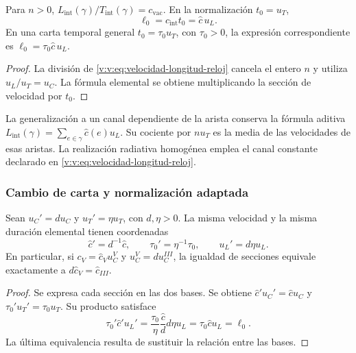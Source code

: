 \begin{corollary}
\label{v:v:cor:longitud-elemental-constitutiva}
Para $n>0$, $L_{\mathrm{int}}(\gamma)/T_{\mathrm{int}}(\gamma)
=c_{\mathrm{vac}}$. En la normalización $t_0=u_T$,
\begin{equation}
 \ell_0=c_{\mathrm{int}}t_0=\widehat c\,u_L.
 \label{v:v:eq:longitud-elemental-constitutiva}
\end{equation}
En una carta temporal general $t_0=\tau_0u_T$, con $\tau_0>0$,
la expresión correspondiente es $\ell_0=\tau_0\widehat c\,u_L$.
\end{corollary}
\begin{proof}
La división de \eqref{v:v:eq:velocidad-longitud-reloj} cancela el entero
$n$ y utiliza $u_L/u_T=u_C$. La fórmula elemental se obtiene
multiplicando la sección de velocidad por $t_0$.
\end{proof}

La generalización a un canal dependiente de la arista conserva la fórmula
aditiva $L_{\mathrm{int}}(\gamma)=\sum_{e\in\gamma}\widehat c(e)u_L$.
Su cociente por $nu_T$ es la media de las velocidades de esas aristas.
La realización radiativa homogénea emplea el canal constante declarado
en \eqref{v:v:eq:velocidad-longitud-reloj}.

\subsubsection{Cambio de carta y normalización adaptada}

\begin{proposition}
\label{v:v:prop:covariancia-identidad-velocidad}
Sean $u_C'=d u_C$ y $u_T'=\eta u_T$, con $d,\eta>0$.
La misma velocidad y la misma duración elemental tienen coordenadas
\begin{equation}
 \widehat c'=d^{-1}\widehat c,
 \qquad \tau_0'=\eta^{-1}\tau_0,
 \qquad u_L'=d\eta u_L.
 \label{v:v:eq:velocidad-cambio-carta}
\end{equation}
En particular, si $c_V=\widehat c_Vu_C^V$ y
$u_C^V=d u_C^{III}$, la igualdad de secciones equivale exactamente a
$d\widehat c_V=\widehat c_{III}$.
\end{proposition}
\begin{proof}
Se expresa cada sección en las dos bases. Se obtiene
$\widehat c'u_C'=\widehat c u_C$ y
$\tau_0'u_T'=\tau_0u_T$. Su producto satisface
\[
 \tau_0'\widehat c' u_L'
 =\frac{\tau_0}{\eta}\frac{\widehat c}{d}
       d\eta u_L
 =\tau_0\widehat c u_L=\ell_0.
\]
La última equivalencia resulta de sustituir la relación entre las bases.
\end{proof}

